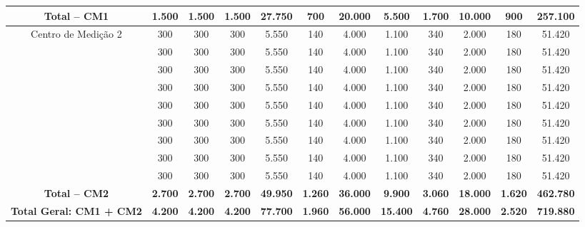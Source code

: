 \documentclass[12pt,openright,oneside,a4paper,brazil]{abntex2}
\begin{document}
\begin{table}[H]
\begin{sideways}
\begin{minipage}{\textheight}
{\begin{tabular}{c | c c c c c c c c c c | c}
            \textbf{Total -- CM1} & \textbf{1.500} & \textbf{1.500} & \textbf{1.500} & \textbf{27.750} & \textbf{700} & \textbf{20.000} & \textbf{5.500} & \textbf{1.700} & \textbf{10.000} & \textbf{900} & \textbf{257.100} \\
            \hline
            \multirow{9}{*}{Centro de Medi\c{c}\~ao 2}
            & 300 & 300 & 300 & 5.550 & 140 & 4.000 & 1.100 & 340 & 2.000 & 180 & 51.420 \\
            & 300 & 300 & 300 & 5.550 & 140 & 4.000 & 1.100 & 340 & 2.000 & 180 & 51.420 \\
            & 300 & 300 & 300 & 5.550 & 140 & 4.000 & 1.100 & 340 & 2.000 & 180 & 51.420 \\
            & 300 & 300 & 300 & 5.550 & 140 & 4.000 & 1.100 & 340 & 2.000 & 180 & 51.420 \\
            & 300 & 300 & 300 & 5.550 & 140 & 4.000 & 1.100 & 340 & 2.000 & 180 & 51.420 \\
            & 300 & 300 & 300 & 5.550 & 140 & 4.000 & 1.100 & 340 & 2.000 & 180 & 51.420 \\
            & 300 & 300 & 300 & 5.550 & 140 & 4.000 & 1.100 & 340 & 2.000 & 180 & 51.420 \\
            & 300 & 300 & 300 & 5.550 & 140 & 4.000 & 1.100 & 340 & 2.000 & 180 & 51.420 \\
            & 300 & 300 & 300 & 5.550 & 140 & 4.000 & 1.100 & 340 & 2.000 & 180 & 51.420 \\
            \hline
            \rowcolor[HTML]{fde6c7}
            \textbf{Total -- CM2} & \textbf{2.700} & \textbf{2.700} & \textbf{2.700} & \textbf{49.950} & \textbf{1.260} & \textbf{36.000} & \textbf{9.900} & \textbf{3.060} & \textbf{18.000} & \textbf{1.620} & \textbf{462.780} \\
            \hline \rowcolor[HTML]{ffc187}
            \textbf{Total Geral: CM1 + CM2} & \textbf{4.200} & \textbf{4.200} & \textbf{4.200} & \textbf{77.700} & \textbf{1.960} & \textbf{56.000} & \textbf{15.400} & \textbf{4.760} & \textbf{28.000} & \textbf{2.520} & \textbf{719.880} \\
            \bottomrule
            \end{tabular}%
        }
        
        \vspace{0.15cm}
    \end{minipage}
\end{sideways}

\end{table}
\end{document}
